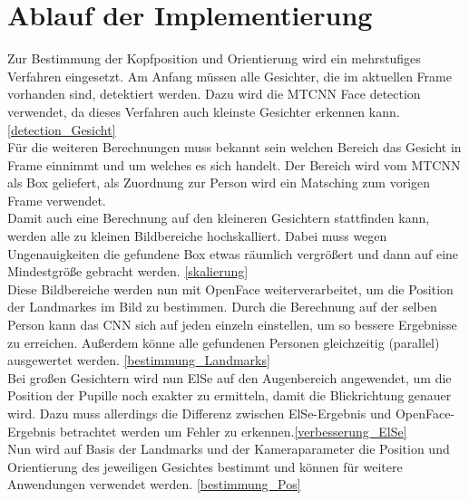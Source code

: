 \section{Ablauf der Implementierung}
Zur Bestimmung der Kopfposition und Orientierung wird ein mehrstufiges Verfahren eingesetzt. Am Anfang müssen alle Gesichter, die im aktuellen Frame vorhanden sind, detektiert werden. Dazu wird die MTCNN Face detection verwendet, da dieses Verfahren auch kleinste Gesichter erkennen kann. \autoref{detection_Gesicht}\\
Für die weiteren Berechnungen muss bekannt sein welchen Bereich das Gesicht in Frame einnimmt und um welches es sich handelt. Der Bereich wird vom MTCNN als Box geliefert, als Zuordnung zur Person wird ein Matsching zum vorigen Frame verwendet.\\
Damit auch eine Berechnung auf den kleineren Gesichtern stattfinden kann, werden alle zu kleinen Bildbereiche hochskalliert. Dabei muss wegen Ungenauigkeiten die gefundene Box etwas räumlich vergrößert und dann auf eine Mindestgröße gebracht werden. \autoref{skalierung}\\
Diese Bildbereiche werden nun mit OpenFace weiterverarbeitet, um die Position der Landmarkes im Bild zu bestimmen. Durch die Berechnung auf der selben Person kann das CNN sich auf jeden einzeln einstellen, um so bessere Ergebnisse zu erreichen. Außerdem könne alle gefundenen Personen gleichzeitig (parallel) ausgewertet werden. \autoref{bestimmung_Landmarks}\\
Bei großen Gesichtern wird nun ElSe auf den Augenbereich angewendet, um die Position der Pupille noch exakter zu ermitteln, damit die Blickrichtung genauer wird. Dazu muss allerdings die Differenz zwischen ElSe-Ergebnis und OpenFace-Ergebnis betrachtet werden um Fehler zu erkennen.\autoref{verbesserung_ElSe}\\
Nun wird auf Basis der Landmarks und der Kameraparameter die Position und Orientierung des jeweiligen Gesichtes bestimmt und können für weitere Anwendungen verwendet werden. \autoref{bestimmung_Pos}